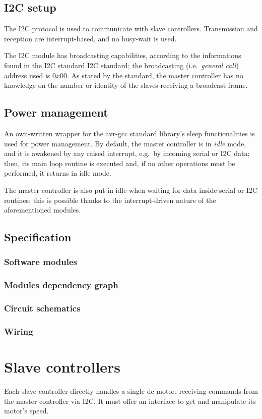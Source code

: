 \documentclass[binding=0.6cm,Lau]{sapthesis}
\begin{document}
\section{I2C setup}
The I2C protocol is used to communicate with slave controllers. Transmission
and reception are interrupt-based, and no busy-wait is used.

The I2C module has broadcasting capabilities, according to the informations
found in the I2C standard I2C standard\cite{i2c-ref}; the broadcasting (i.e.\
\emph{general call}) address used is $0x00$. As stated by the standard, the
master controller has no knowledge on the number or identity of the slaves
receiving a broadcast frame.

\section{Power management}
An own-written wrapper for the avr-gcc standard library's sleep functionalities is used for power management.
By default, the master controller is in \emph{idle} mode, and it is awakened by
any raised interrupt, e.g.\ by incoming serial or I2C data; then, its main loop
routine is executed and, if no other operations must be performed, it returns
in idle mode.

The master controller is also put in idle when waiting for data inside serial
or I2C routines; this is possible thanks to the interrupt-driven nature of the
aforementioned modules.

\section{Specification}
\subsection{Software modules}
\subsection{Modules dependency graph}
\subsection{Circuit schematics}
\subsection{Wiring}


\chapter{Slave controllers}
\label{ch:slave}
Each slave controller directly handles a single dc motor, receiving commands
from the master controller via I2C. It must offer an interface to get and
manipulate its motor's speed.
\end{document}

